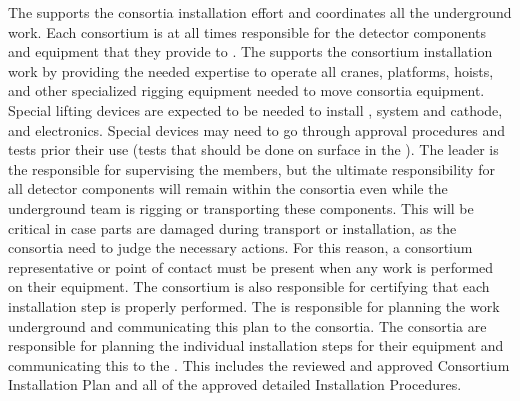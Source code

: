The  supports the consortia installation effort and coordinates all the  underground work.
Each consortium is at all times responsible for the detector components and equipment that they provide to .
The  supports the consortium installation work by providing the needed expertise to operate all cranes, platforms, hoists, and other specialized rigging equipment needed to move consortia equipment.
Special lifting devices are expected to be needed to install ,  system  and cathode, and electronics.
Special devices may need to go through approval procedures and tests prior their use (tests that should be done on surface in the ).
The  leader is the responsible for supervising the  members, but the ultimate responsibility for all detector components will remain within the consortia even while the underground team is rigging or transporting these components.
This will be critical in case parts are damaged during transport or installation, as the consortia need to judge the necessary actions.
For this reason, a consortium representative or point of contact must be present when any work is performed on their equipment.
The consortium is also responsible for certifying that each installation step is properly performed.
The  is responsible for planning the work underground and communicating this plan to the consortia.
The consortia are responsible for planning the individual installation steps for their equipment and communicating this to the .
This includes the reviewed and approved Consortium Installation Plan and all of the approved detailed Installation Procedures.









